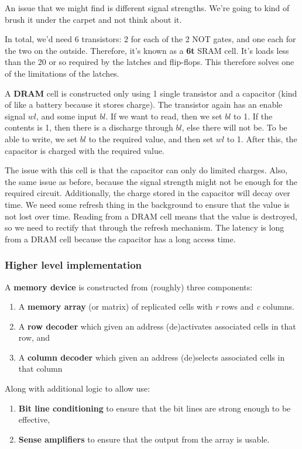 \documentclass[11pt,a4paper,titlepage,dvipsnames,cmyk]{scrartcl}
\begin{document}
An issue that we might find is different signal strengths. We're going to
kind of brush it under the carpet and not think about it.

In total, we'd need 6 transistors: 2 for each of the 2 NOT gates, and one
each for the two on the outside. Therefore, it's known as a \textbf{6t}
SRAM cell. It's loads less than the 20 or so required by the latches and
flip-flops. This therefore solves one of the limitations of the latches.

A \textbf{DRAM} cell is constructed only using 1 single transistor and a
capacitor (kind of like a battery because it stores charge). The
transistor again has an enable signal $wl$, and some input $bl$. If we
want to read, then we set $bl$ to 1. If the contents is 1, then there is a
discharge through $bl$, else there will not be.  To be able to write, we
set $bl$ to the required value, and then set $wl$ to 1. After this, the
capacitor is charged with the required value.

The issue with this cell is that the capacitor can only do limited
charges. Also, the same issue as before, because the signal strength might
not be enough for the required circuit. Additionally, the charge stored in
the capacitor will decay over time. We need some refresh thing in the
background to ensure that the value is not lost over time.  Reading from a
DRAM cell means that the value is destroyed, so we need to rectify that
through the refresh mechanism. The latency is long from a DRAM cell
because the capacitor has a long access time.

\subsubsection{Higher level implementation}%
\label{ssub:high-level}
A \textbf{memory device} is constructed from (roughly) three components:
\begin{enumerate}
    \item A \textbf{memory array} (or matrix) of replicated cells with
        \textit{r} rows and \textit{c} columns.
    \item A \textbf{row decoder} which given an address (de)activates
        associated cells in that row, and
    \item A \textbf{column decoder} which given an address (de)selects
        associated cells in that column
\end{enumerate}

Along with additional logic to allow use:
\begin{enumerate}
    \item \textbf{Bit line conditioning} to ensure that the bit lines are
        strong enough to be effective,
    \item \textbf{Sense amplifiers} to ensure that the output from the
        array is usable.
\end{enumerate}
\end{document}
